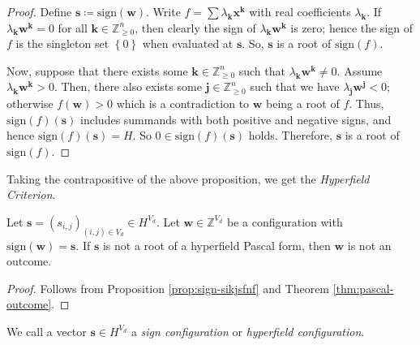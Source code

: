 \begin{proof}
    Define \( \mathbf{s} \coloneqq \mathrm{sign}(\mathbf{w}) \). Write \( f = \sum \lambda_{\mathbf{k}} \mathbf{x}^{\mathbf{k}} \) with real coefficients \( \lambda_{\mathbf{k}} \). If \( \lambda_{\mathbf{k}} \mathbf{w}^{\mathbf{k}} = 0 \) for all \( \mathbf{k} \in \mathbb{Z}^n_{\geq 0} \), then clearly the sign of \( \lambda_{\mathbf{k}} \mathbf{w}^{\mathbf{k}} \) is zero; hence the sign of \( f \) is the singleton set \( \left\{ 0 \right\} \) when evaluated at \( \mathbf{s} \). So, \( \mathbf{s} \) is a root of \( \mathrm{sign}(f) \).

    Now, suppose that there exists some \( \mathbf{k} \in \mathbb{Z}^n_{\geq 0} \) such that \( \lambda_{\mathbf{k}} \mathbf{w}^{\mathbf{k}} \neq 0 \). Assume \(  \lambda_{\mathbf{k}} \mathbf{w}^{\mathbf{k}} > 0 \). Then, there also exists some \( \mathbf{j} \in \mathbb{Z}^n_{\geq 0} \) such that we have \( \lambda_{\mathbf{j}} \mathbf{w}^{\mathbf{j}} < 0 \); otherwise \( f(\mathbf{w}) > 0 \) which is a contradiction to \( \mathbf{w} \) being a root of \( f \). Thus, \( \mathrm{sign}(f)(\mathbf{s}) \) includes summands with both positive and negative signs, and hence \( \mathrm{sign}(f)(\mathbf{s}) = H \). So \( 0 \in  \mathrm{sign}(f)(\mathbf{s}) \) holds. Therefore, \( \mathbf{s} \) is a root of \( \mathrm{sign}(f) \).
\end{proof}

Taking the contrapositive of the above proposition, we get the \emph{Hyperfield Criterion}.

\begin{proposition}\label{prop:hyperfield-criterion}
    Let \( \mathbf{s} = (s_{i,j})_{(i,j) \in V_d} \in H^{V_d} \). Let \( \mathbf{w} \in \mathbb{Z}^{V_d} \) be a configuration with \( \mathrm{sign}(\mathbf{w}) = \mathbf{s} \). If \( \mathbf{s} \) is not a root of a hyperfield Pascal form, then \( \mathbf{w} \) is not an outcome.
\end{proposition}

\begin{proof}
    Follows from Proposition \ref{prop:sign-sikjsfnf} and Theorem \ref{thm:pascal-outcome}.
\end{proof}

We call a vector \( \mathbf{s} \in H^{V_d} \) a \emph{sign configuration} or \emph{hyperfield configuration}. 

